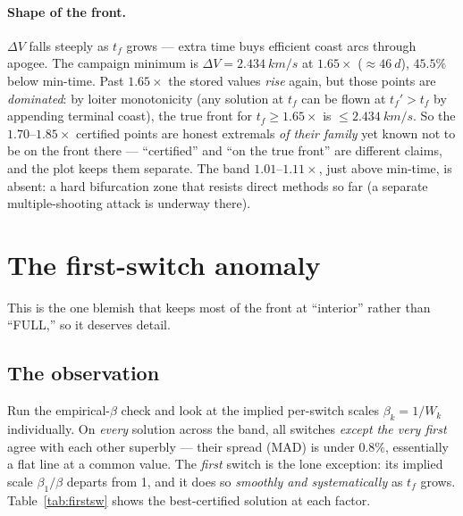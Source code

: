 \documentclass[11pt]{article}
\newcommand{\dV}{\Delta V}
\newcommand{\tf}{t_f}
\begin{document}
\paragraph{Shape of the front.} $\dV$ falls steeply as $\tf$ grows --- extra time
buys efficient coast arcs through apogee. The campaign minimum is
$\dV=\SI{2.434}{km/s}$ at $1.65\times$ ($\approx\SI{46}{d}$), $45.5\%$ below
min-time. Past $1.65\times$ the stored values \emph{rise} again, but those points
are \emph{dominated}: by loiter monotonicity (any solution at $\tf$ can be flown
at $\tf'>\tf$ by appending terminal coast), the true front for $\tf\ge1.65\times$
is $\le\SI{2.434}{km/s}$. So the $1.70$--$1.85\times$ certified points are honest
extremals \emph{of their family} yet known not to be on the front there ---
``certified'' and ``on the true front'' are different claims, and the plot keeps
them separate. The band $1.01$--$1.11\times$, just above min-time, is absent: a
hard bifurcation zone that resists direct methods so far (a separate
multiple-shooting attack is underway there).

\section{The first-switch anomaly}
\label{sec:firstswitch}

This is the one blemish that keeps most of the front at ``interior'' rather than
``FULL,'' so it deserves detail.

\subsection{The observation}

Run the empirical-$\beta$ check and look at the implied per-switch scales
$\beta_k=1/W_k$ individually. On \emph{every} solution across the band, all
switches \emph{except the very first} agree with each other superbly --- their
spread (MAD) is under $0.8\%$, essentially a flat line at a common value. The
\emph{first} switch is the lone exception: its implied scale
$\beta_1/\beta$ departs from 1, and it does so \emph{smoothly and
systematically} as $\tf$ grows. Table~\ref{tab:firstsw} shows the best-certified
solution at each factor.
\end{document}
